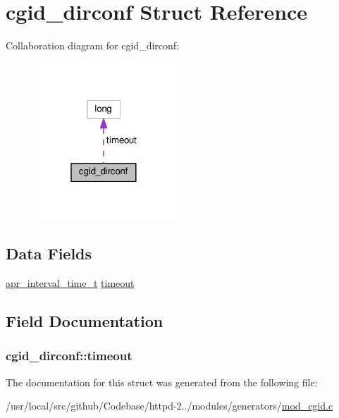 \hypertarget{structcgid__dirconf}{}\section{cgid\+\_\+dirconf Struct Reference}
\label{structcgid__dirconf}


Collaboration diagram for cgid\+\_\+dirconf\+:
\nopagebreak
\begin{figure}[H]
\begin{center}
\leavevmode
\includegraphics[width=151pt]{structcgid__dirconf__coll__graph}
\end{center}
\end{figure}
\subsection*{Data Fields}
\begin{DoxyCompactItemize}
\item 
\hyperlink{group__apr__time_gaae2129185a395cc393f76fabf4f43e47}{apr\+\_\+interval\+\_\+time\+\_\+t} \hyperlink{structcgid__dirconf_a634ce2e396ed7faa19d2e1a201c9ae31}{timeout}
\end{DoxyCompactItemize}


\subsection{Field Documentation}
\subsubsection[{\texorpdfstring{timeout}{timeout}}]{ cgid\+\_\+dirconf\+::timeout}\hypertarget{structcgid__dirconf_a634ce2e396ed7faa19d2e1a201c9ae31}{}\label{structcgid__dirconf_a634ce2e396ed7faa19d2e1a201c9ae31}


The documentation for this struct was generated from the following file\+:\begin{DoxyCompactItemize}
\item 
/usr/local/src/github/\+Codebase/httpd-\/2../modules/generators/\hyperlink{mod__cgid_8c}{mod\+\_\+cgid.\+c}\end{DoxyCompactItemize}
